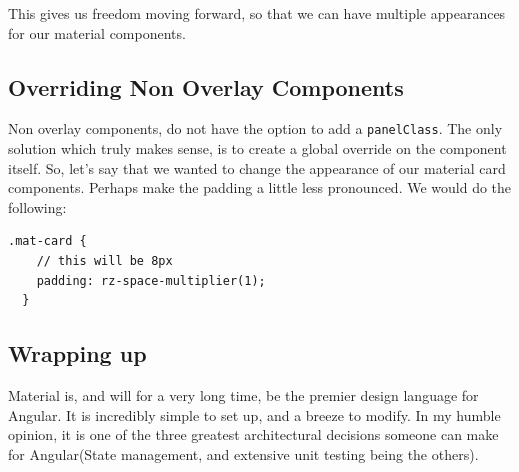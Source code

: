 This gives us freedom moving forward, so that we can have multiple appearances
for our material components.

\subsection{Overriding Non Overlay Components}
Non overlay components, do not have the option to add a \lstinline{panelClass}.
The only solution which truly makes sense, is to create a global override on
the component itself. So, let's say that we wanted to change the appearance of
our material card components. Perhaps make the padding a little less pronounced.
We would do the following: 
\begin{lstlisting}[caption=\_mat-card.scss override]
  .mat-card {
    // this will be 8px
    padding: rz-space-multiplier(1);
  }
\end{lstlisting}

\subsection{Wrapping up}
Material is, and will for a very long time, be the premier design language for
Angular. It is incredibly simple to set up, and a breeze to modify. In my humble 
opinion, it is one of the three greatest architectural decisions someone can make 
for Angular(State management, and extensive unit testing being the others).
